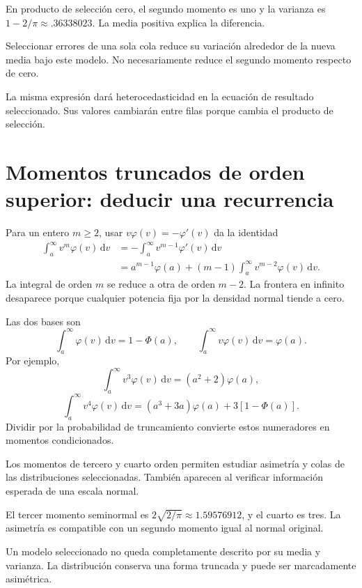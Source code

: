 \documentclass[11pt,a4paper]{article}
\newcommand{\dd}{\,\mathrm d}
\begin{document}
\begin{ejemplo}[Seminormal]
En producto de selección cero,
el segundo momento es uno
y la varianza es \(1-2/\pi\approx.36338023\).
La media positiva explica la diferencia.
\end{ejemplo}
Seleccionar errores de una sola cola
reduce su variación alrededor de
la nueva media bajo este modelo.
No necesariamente reduce el segundo
momento respecto de cero.

La misma expresión dará
heterocedasticidad en la ecuación
de resultado seleccionado.
Sus valores cambiarán entre filas
porque cambia el producto de selección.

\clearpage
\section{Momentos truncados de orden superior: deducir una recurrencia}\label{unidad69}
Para un entero \(m\ge2\),
usar \(v\varphi(v)=-\varphi'(v)\)
da la identidad
\[
\begin{aligned}
\int_a^\infty v^m\varphi(v)\dd v
&=-\int_a^\infty v^{m-1}\varphi'(v)\dd v\\
&=a^{m-1}\varphi(a)
+(m-1)\int_a^\infty v^{m-2}\varphi(v)\dd v.
\end{aligned}
\]
La integral de orden \(m\) se reduce
a otra de orden \(m-2\).
La frontera en infinito desaparece
porque cualquier potencia fija
por la densidad normal tiende a cero.

Las dos bases son
\[
\int_a^\infty\varphi(v)\dd v=1-\Phi(a),
\qquad
\int_a^\infty v\varphi(v)\dd v=\varphi(a).
\]
Por ejemplo,
\[
\int_a^\infty v^3\varphi(v)\dd v
=(a^2+2)\varphi(a),
\]
\[
\int_a^\infty v^4\varphi(v)\dd v
=(a^3+3a)\varphi(a)+3[1-\Phi(a)].
\]
Dividir por la probabilidad de truncamiento
convierte estos numeradores en
momentos condicionados.

Los momentos de tercero y cuarto orden
permiten estudiar asimetría y colas
de las distribuciones seleccionadas.
También aparecen al verificar
información esperada de una escala normal.

\begin{ejemplo}
El tercer momento seminormal es
\(2\sqrt{2/\pi}\approx1.59576912\),
y el cuarto es tres.
La asimetría es compatible con
un segundo momento igual al normal original.
\end{ejemplo}
Un modelo seleccionado no queda
completamente descrito por su media
y varianza. La distribución conserva
una forma truncada y puede ser
marcadamente asimétrica.
\end{document}
